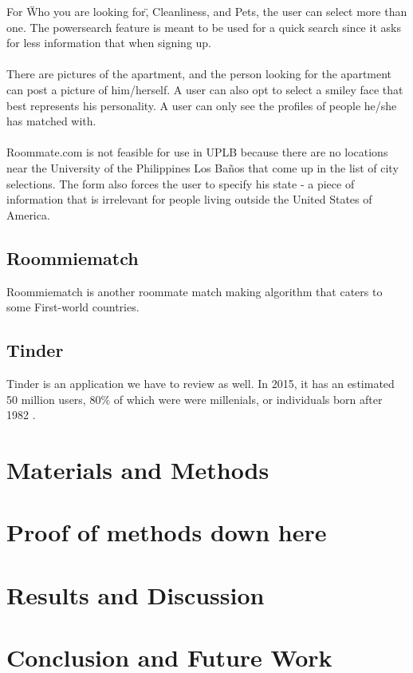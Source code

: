 \documentclass[11pt, draft, journal]{./IEEE/IEEEtran}
\newcommand{\UPLB}{University of the Philippines Los Ba\~{n}os }
\begin{document}
For \"Who you are looking for\", Cleanliness, and Pets, the user can select more than one. The powersearch feature is meant to be used for a quick search since it asks for less information that when signing up.
\\
\\
\indent There are pictures of the apartment, and the person looking for the apartment can post a picture of him/herself. A user can also opt to select a smiley face that best represents his personality. A user can only see the profiles of people he/she has matched with.
\\
\\
\indent Roommate.com is not feasible for use in UPLB because there are no locations near the \UPLB that come up in the list of city selections. The form also forces the user to specify his state - a piece of information that is irrelevant for people living outside the United States of America.
\subsection{Roommiematch}
Roommiematch is another roommate match making algorithm that caters to some First-world countries.
\subsection{Tinder}
Tinder is an application we have to review as well. In 2015, it has an estimated 50 million users\cite{tinderstat2}, 80\% of which were were millenials, or individuals born after 1982 \cite{tinderstat}\cite{millenial}.


\section{Materials and Methods}
\section{Proof of methods down here}

\section{Results and Discussion}

\section{Conclusion and Future Work}
\end{document}
